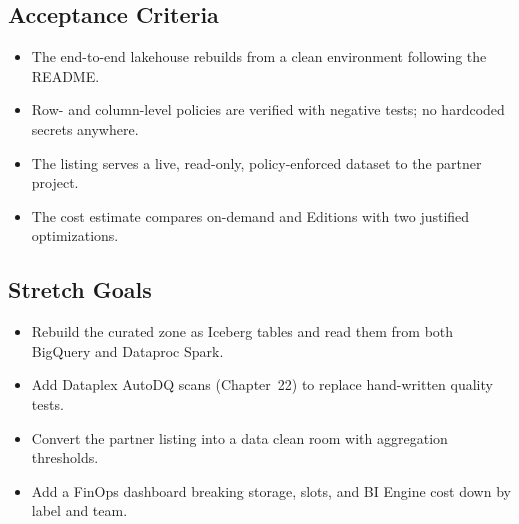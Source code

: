 \subsection*{Acceptance Criteria}
\begin{itemize}
    \item The end-to-end lakehouse rebuilds from a clean environment following the README.
    \item Row- and column-level policies are verified with negative tests; no hardcoded secrets anywhere.
    \item The listing serves a live, read-only, policy-enforced dataset to the partner project.
    \item The cost estimate compares on-demand and Editions with two justified optimizations.
\end{itemize}

\subsection*{Stretch Goals}
\begin{itemize}
    \item Rebuild the curated zone as Iceberg tables and read them from both BigQuery and Dataproc Spark.
    \item Add Dataplex AutoDQ scans (Chapter~22) to replace hand-written quality tests.
    \item Convert the partner listing into a data clean room with aggregation thresholds.
    \item Add a FinOps dashboard breaking storage, slots, and BI Engine cost down by label and team.
\end{itemize}
